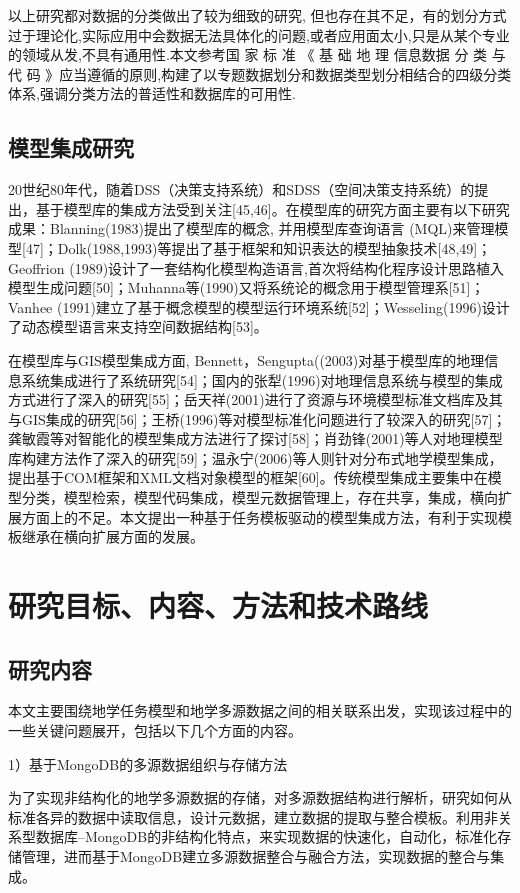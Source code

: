 \documentclass[master]{njnuthesis}
\begin{document}
以上研究都对数据的分类做出了较为细致的研究, 但也存在其不足，有的划分方式过于理论化,实际应用中会数据无法具体化的问题,或者应用面太小,只是从某个专业的领域从发,不具有通用性.本文参考国 家 标 准 《 基 础 地 理 信息数据 分 类 与代 码 》应当遵循的原则,构建了以专题数据划分和数据类型划分相结合的四级分类体系,强调分类方法的普适性和数据库的可用性.

\subsection{模型集成研究}
20世纪80年代，随着DSS（决策支持系统）和SDSS（空间决策支持系统）的提出，基于模型库的集成方法受到关注[45,46]。在模型库的研究方面主要有以下研究成果：Blanning(1983)提出了模型库的概念, 并用模型库查询语言 (MQL)来管理模型[47]；Dolk(1988,1993)等提出了基于框架和知识表达的模型抽象技术[48,49]；Geoffrion (1989)设计了一套结构化模型构造语言,首次将结构化程序设计思路植入模型生成问题[50]；Muhanna等(1990)又将系统论的概念用于模型管理系[51]；Vanhee (1991)建立了基于概念模型的模型运行环境系统[52]；Wesseling(1996)设计了动态模型语言来支持空间数据结构[53]。 

在模型库与GIS模型集成方面, Bennett，Sengupta((2003)对基于模型库的地理信息系统集成进行了系统研究[54]；国内的张犁(1996)对地理信息系统与模型的集成方式进行了深入的研究[55]；岳天祥(2001)进行了资源与环境模型标准文档库及其与GIS集成的研究[56]；王桥(1996)等对模型标准化问题进行了较深入的研究[57]；龚敏霞等对智能化的模型集成方法进行了探讨[58]；肖劲锋(2001)等人对地理模型库构建方法作了深入的研究[59]；温永宁(2006)等人则针对分布式地学模型集成，提出基于COM框架和XML文档对象模型的框架[60]。传统模型集成主要集中在模型分类，模型检索，模型代码集成，模型元数据管理上，存在共享，集成，横向扩展方面上的不足。本文提出一种基于任务模板驱动的模型集成方法，有利于实现模板继承在横向扩展方面的发展。

\section{研究目标、内容、方法和技术路线}
\subsection{研究内容}
本文主要围绕地学任务模型和地学多源数据之间的相关联系出发，实现该过程中的一些关键问题展开，包括以下几个方面的内容。

1）基于MongoDB的多源数据组织与存储方法

为了实现非结构化的地学多源数据的存储，对多源数据结构进行解析，研究如何从标准各异的数据中读取信息，设计元数据，建立数据的提取与整合模板。利用非关系型数据库--MongoDB的非结构化特点，来实现数据的快速化，自动化，标准化存储管理，进而基于MongoDB建立多源数据整合与融合方法，实现数据的整合与集成。
\end{document}
